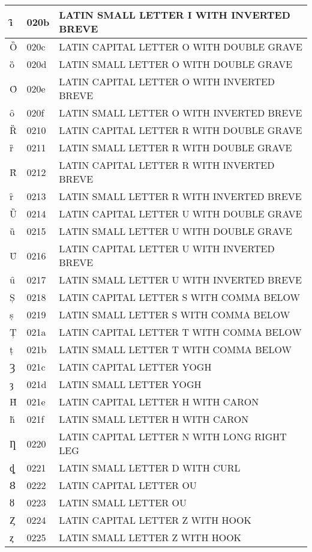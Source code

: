 \documentclass[12pt,letterpaper,openany]{book}
\begin{document}
\begin{center}
\begin{supertabular}{|m{0.25in}|m{0.5in}|m{4in}|}
			ȋ & 020b & LATIN SMALL LETTER I WITH INVERTED BREVE\\\hline
			Ȍ & 020c & LATIN CAPITAL LETTER O WITH DOUBLE GRAVE\\\hline
			ȍ & 020d & LATIN SMALL LETTER O WITH DOUBLE GRAVE\\\hline
			Ȏ & 020e & LATIN CAPITAL LETTER O WITH INVERTED BREVE\\\hline
			ȏ & 020f & LATIN SMALL LETTER O WITH INVERTED BREVE\\\hline
			Ȑ & 0210 & LATIN CAPITAL LETTER R WITH DOUBLE GRAVE\\\hline
			ȑ & 0211 & LATIN SMALL LETTER R WITH DOUBLE GRAVE\\\hline
			Ȓ & 0212 & LATIN CAPITAL LETTER R WITH INVERTED BREVE\\\hline
			ȓ & 0213 & LATIN SMALL LETTER R WITH INVERTED BREVE\\\hline
			Ȕ & 0214 & LATIN CAPITAL LETTER U WITH DOUBLE GRAVE\\\hline
			ȕ & 0215 & LATIN SMALL LETTER U WITH DOUBLE GRAVE\\\hline
			Ȗ & 0216 & LATIN CAPITAL LETTER U WITH INVERTED BREVE\\\hline
			ȗ & 0217 & LATIN SMALL LETTER U WITH INVERTED BREVE\\\hline
			Ș & 0218 & LATIN CAPITAL LETTER S WITH COMMA BELOW\\\hline
			ș & 0219 & LATIN SMALL LETTER S WITH COMMA BELOW\\\hline
			Ț & 021a & LATIN CAPITAL LETTER T WITH COMMA BELOW\\\hline
			ț & 021b & LATIN SMALL LETTER T WITH COMMA BELOW\\\hline
			Ȝ & 021c & LATIN CAPITAL LETTER YOGH\\\hline
			ȝ & 021d & LATIN SMALL LETTER YOGH\\\hline
			Ȟ & 021e & LATIN CAPITAL LETTER H WITH CARON\\\hline
			ȟ & 021f & LATIN SMALL LETTER H WITH CARON\\\hline
			Ƞ & 0220 & LATIN CAPITAL LETTER N WITH LONG RIGHT LEG\\\hline
			ȡ & 0221 & LATIN SMALL LETTER D WITH CURL\\\hline
			Ȣ & 0222 & LATIN CAPITAL LETTER OU\\\hline
			ȣ & 0223 & LATIN SMALL LETTER OU\\\hline
			Ȥ & 0224 & LATIN CAPITAL LETTER Z WITH HOOK\\\hline
			ȥ & 0225 & LATIN SMALL LETTER Z WITH HOOK\\\hline

\end{supertabular}
\end{center}
\end{document}
